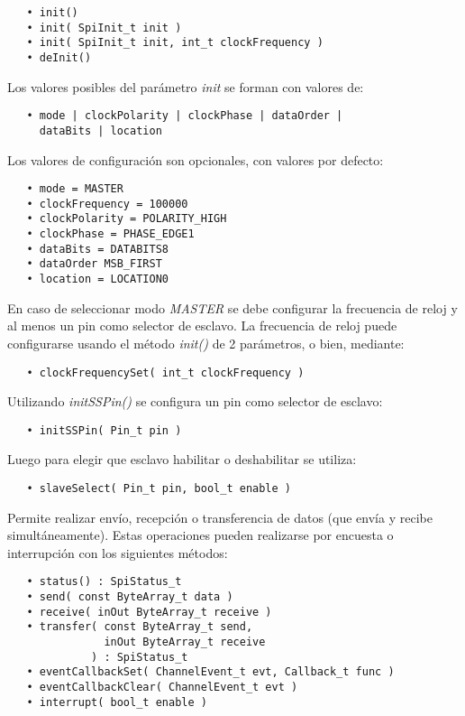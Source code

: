 \begin{verbatim}
   • init()
   • init( SpiInit_t init )
   • init( SpiInit_t init, int_t clockFrequency )
   • deInit()
\end{verbatim}

Los valores posibles del parámetro \emph{init} se forman con valores de:

\begin{verbatim}
   • mode | clockPolarity | clockPhase | dataOrder |
     dataBits | location
\end{verbatim}

Los valores de configuración son opcionales, con valores por defecto:

\begin{verbatim}
   • mode = MASTER
   • clockFrequency = 100000
   • clockPolarity = POLARITY_HIGH
   • clockPhase = PHASE_EDGE1
   • dataBits = DATABITS8
   • dataOrder MSB_FIRST
   • location = LOCATION0
\end{verbatim}

En caso de seleccionar modo \emph{MASTER} se debe configurar la frecuencia de reloj y al menos un pin como selector de esclavo. La frecuencia de reloj puede configurarse usando el método \emph{init()} de 2 parámetros, o bien, mediante:

\begin{verbatim}
   • clockFrequencySet( int_t clockFrequency )
\end{verbatim}

Utilizando \emph{initSSPin()} se configura un pin como selector de esclavo:

\begin{verbatim}
   • initSSPin( Pin_t pin )
\end{verbatim}

Luego para elegir que esclavo habilitar o deshabilitar se utiliza:

\begin{verbatim}
   • slaveSelect( Pin_t pin, bool_t enable )
\end{verbatim}

Permite realizar envío, recepción o transferencia de datos (que envía y recibe simultáneamente). Estas operaciones pueden realizarse por encuesta o interrupción con los siguientes métodos:

\begin{verbatim}
   • status() : SpiStatus_t
   • send( const ByteArray_t data )
   • receive( inOut ByteArray_t receive )
   • transfer( const ByteArray_t send, 
               inOut ByteArray_t receive
             ) : SpiStatus_t
   • eventCallbackSet( ChannelEvent_t evt, Callback_t func )
   • eventCallbackClear( ChannelEvent_t evt )
   • interrupt( bool_t enable )
\end{verbatim}

